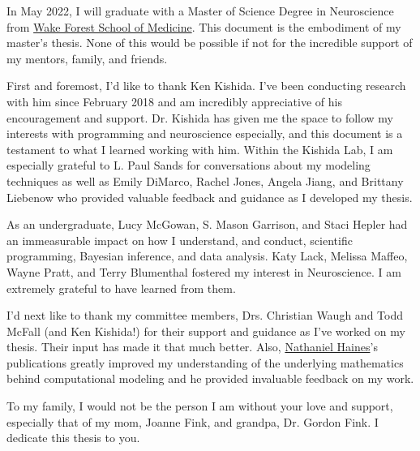 
\begin{acknowledgements}

In May 2022, I will graduate with a Master of Science Degree in Neuroscience from \href{https://wakehealth.edu}{Wake Forest School of Medicine}. This document is the embodiment of my master's thesis. None of this would be possible if not for the incredible support of my mentors, family, and friends.

First and foremost, I'd like to thank Ken Kishida. I've been conducting research with him since February 2018 and am incredibly appreciative of his encouragement and support. Dr. Kishida has given me the space to follow my interests with programming and neuroscience especially, and this document is a testament to what I learned working with him.  Within the Kishida Lab, I am especially grateful to L. Paul Sands for conversations about my modeling techniques as well as Emily DiMarco, Rachel Jones, Angela Jiang, and Brittany Liebenow who provided valuable feedback and guidance as I developed my thesis.

As an undergraduate, Lucy McGowan, S. Mason Garrison, and Staci Hepler had an immeasurable impact on how I understand, and conduct, scientific programming, Bayesian inference, and data analysis. Katy Lack, Melissa Maffeo, Wayne Pratt, and Terry Blumenthal fostered my interest in Neuroscience. I am extremely grateful to have learned from them.

I'd next like to thank my committee members, Drs. Christian Waugh and Todd McFall (and Ken Kishida!) for their support and guidance as I've worked on my thesis. Their input has made it that much better. Also, \href{http://haines-lab.com}{Nathaniel Haines}'s publications greatly improved my understanding of the underlying mathematics behind computational modeling and he provided invaluable feedback on my work.

To my family, I would not be the person I am without your love and support, especially that of my mom, Joanne Fink, and grandpa, Dr. Gordon Fink. I dedicate this thesis to you.


\end{acknowledgements}

\tableofcontents

\newpage

\listoffigures

\newpage

